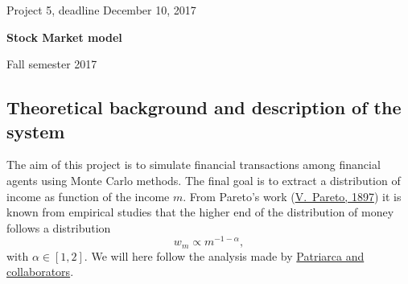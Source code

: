 \documentclass[%
oneside,                 %
final,                   %
10pt]{article}
\begin{document}

\newcommand{\exercisesection}[1]{\subsection*{#1}}






\thispagestyle{empty}

\begin{center}
{\LARGE\bf
\begin{spacing}{1.25}
Project 5, deadline  December 10, 2017
\end{spacing}
}
\end{center}


\begin{center}
{\bf Stock Market model${}^{}$} \\ [0mm]
\end{center}

\begin{center}
\end{center}
    

\begin{center}
Fall semester 2017
\end{center}

\vspace{1cm}


\subsection*{Theoretical background and description of the system}

The aim of this project is to simulate financial transactions among financial agents
using Monte Carlo methods. The final goal is to extract a distribution of income  as function
of the income $m$.   From Pareto's work (\href{{http://www.institutcoppet.org/2012/05/08/cours-deconomie-politique-1896-de-vilfredo-pareto}}{V.~Pareto, 1897}) it is known from empirical studies
that the higher end of the distribution of money follows a distribution 
\[
w_m\propto m^{-1-\alpha},
\]
with $\alpha\in [1,2]$. We will here follow the analysis made by \href{{http://www.sciencedirect.com/science/article/pii/S0378437104004327}}{Patriarca and collaborators}. 
\end{document}
